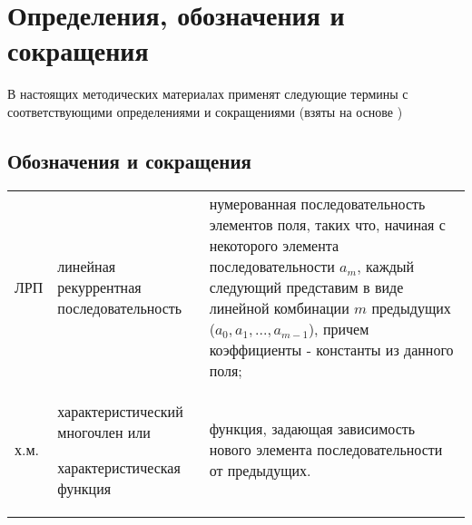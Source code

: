 \documentclass[utf8x, 14pt]{G7-32} %
\begin{document}
\frontmatter %

\maketitle %


\begin{executors}
\end{executors}

\tableofcontents %
 
\chapter{Определения, обозначения и сокращения}
В настоящих методических материалах применят следующие термины с соответствующими определениями и сокращениями (взяты на основе \cite{LRS_additional})
\section{Обозначения и сокращения}
\begin{center}   
\begin{tabular}{ p{}  p{} p{} }
 ЛРП & линейная рекуррентная последовательность  & нумерованная последовательность элементов поля, таких что, начиная с некоторого элемента последовательности $a_m$, каждый следующий представим в виде линейной комбинации $m$ предыдущих ($a_0, a_1, ..., a_{m-1}$), причем коэффициенты - константы из данного поля; \\ 
  х.м. &  характеристический многочлен или \par характеристическая функция  & функция, задающая зависимость нового элемента последовательности от предыдущих. \\
 \end{tabular}
 \end{center} 
 
\end{document}
